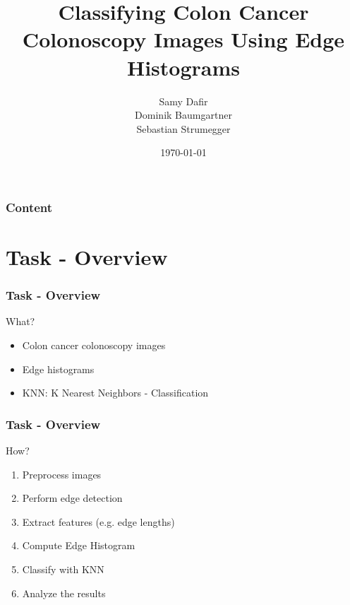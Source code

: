 \documentclass{beamer}
\title{Classifying Colon Cancer Colonoscopy Images Using Edge Histograms}
\author[]{Samy Dafir \\Dominik Baumgartner \\Sebastian Strumegger}
\date{\today}
\begin{document}
\frame{\titlepage}

\begin{frame}
    \frametitle{Content} 
    \tableofcontents 
\end{frame}

\section{Task - Overview}
\begin{frame}
	\frametitle{Task - Overview}
    \begin{block}{What?}
	    \begin{itemize}
		    \item Colon cancer colonoscopy images
		    \item Edge histograms
            \item KNN: K Nearest Neighbors - Classification
	    \end{itemize}
    \end{block}
\end{frame}

\begin{frame}
	\frametitle{Task - Overview}
    \begin{block}{How?}
	    \begin{enumerate}
		    \item Preprocess images
		    \item Perform edge detection
		    \item Extract features (e.g. edge lengths)
            \item Compute Edge Histogram
            \item Classify with KNN
            \item Analyze the results
	    \end{enumerate}
    \end{block}
\end{frame}
\end{document}
